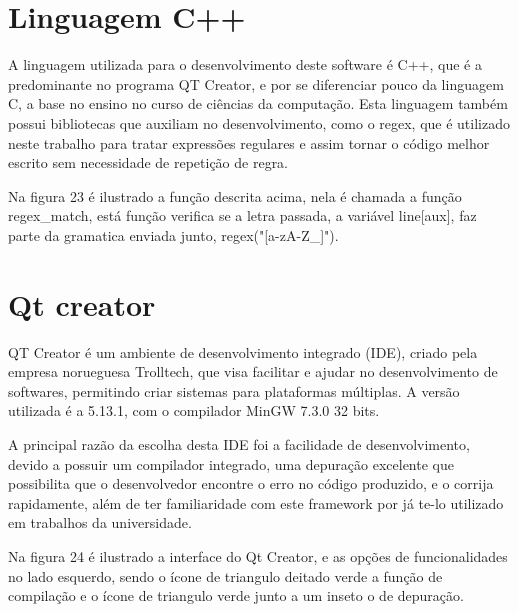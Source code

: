 \documentclass[12pt,oneside,a4paper,chapter=TITLE,section=TITLE,sumario=tradicional]{abntex2}
\begin{document}
\section{Linguagem C++}
\label{sec:linugagemc++}

A linguagem utilizada para o desenvolvimento deste software é C++, que é a predominante no programa QT Creator, e por se diferenciar pouco da linguagem C, a base no ensino no curso de ciências da computação. Esta linguagem também possui bibliotecas que auxiliam no desenvolvimento, como o regex, que é utilizado neste trabalho para tratar expressões regulares e assim tornar o código melhor escrito sem necessidade de repetição de regra.

Na figura 23 é ilustrado a função descrita acima, nela é chamada a função regex\_match, está função verifica se a letra passada, a variável line[aux], faz parte da gramatica enviada junto, regex("[a-zA-Z\_]").

\begin{figure}[htb]
\end{figure} 

\section{Qt creator}
\label{sec:qtcreator}

QT Creator é um ambiente de desenvolvimento integrado (IDE), criado pela empresa norueguesa Trolltech, que visa facilitar e ajudar no desenvolvimento de softwares, permitindo criar sistemas para plataformas múltiplas. A versão utilizada é a 5.13.1, com o compilador MinGW 7.3.0 32 bits. 

A principal razão da escolha desta IDE foi a facilidade de desenvolvimento, devido a possuir um compilador integrado, uma depuração excelente que possibilita que o desenvolvedor encontre o erro no código produzido, e o corrija rapidamente, além de ter familiaridade com este framework por já te-lo utilizado em trabalhos da universidade. 

Na figura 24 é ilustrado a interface do Qt Creator, e as opções de funcionalidades no lado esquerdo, sendo o ícone de triangulo deitado verde a função de compilação e o ícone de triangulo verde junto a um inseto o de depuração.

\begin{figure}[htb]
\end{figure} 
\end{document}
